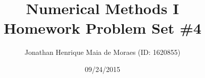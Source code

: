\title{Numerical Methods I \\ Homework Problem Set \#4}
\author{Jonathan Henrique Maia de Moraes (ID: 1620855)}
\date{09/24/2015}
\maketitle